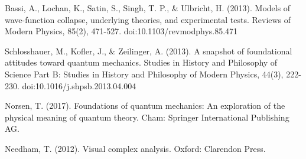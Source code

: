 \documentclass[a4paper,12pt]{book}
\begin{document}
\begin{thebibliography}{9}
	  Bassi, A., Lochan, K., Satin, S., Singh, T. P., \& Ulbricht, H. (2013). Models of wave-function collapse, underlying theories, and experimental tests. Reviews of Modern Physics, 85(2), 471-527. doi:10.1103/revmodphys.85.471
	 
	  Schlosshauer, M., Kofler, J., \& Zeilinger, A. (2013). A snapshot of foundational attitudes toward quantum mechanics. Studies in History and Philosophy of Science Part B: Studies in History and Philosophy of Modern Physics, 44(3), 222-230. doi:10.1016/j.shpsb.2013.04.004
	 
	  Norsen, T. (2017). Foundations of quantum mechanics: An exploration of the physical meaning of quantum theory. Cham: Springer International Publishing AG.
     
      Needham, T. (2012). Visual complex analysis. Oxford: Clarendon Press.
     
\end{thebibliography}
\end{document}
